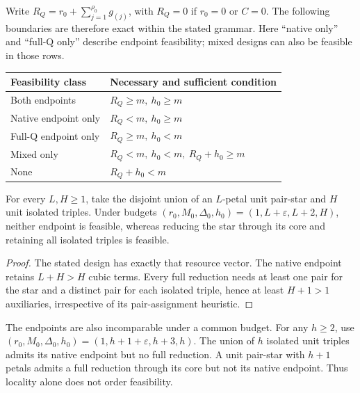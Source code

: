 Write $R_Q=r_0+\sum_{j=1}^{\rho_0}g_{(j)}$, with $R_Q=0$ if $r_0=0$ or
$C=0$. The following boundaries are therefore exact within the stated grammar.
Here ``native only'' and ``full-Q only'' describe endpoint feasibility;
mixed designs can also be feasible in those rows.
\begin{center}
\begin{tabular}{ll}
\toprule
Feasibility class & Necessary and sufficient condition\\
\midrule
Both endpoints & $R_Q\geq m,\ h_0\geq m$\\
Native endpoint only & $R_Q<m,\ h_0\geq m$\\
Full-Q endpoint only & $R_Q\geq m,\ h_0<m$\\
Mixed only & $R_Q<m,\ h_0<m,\ R_Q+h_0\geq m$\\
None & $R_Q+h_0<m$\\
\bottomrule
\end{tabular}
\end{center}

\begin{corollary}
\label{cor:static-star-isolated}
For every $L,H\geq1$, take the disjoint union of an $L$-petal unit pair-star
and $H$ unit isolated triples. Under budgets
$(r_0,M_0,\Delta_0,h_0)=(1,L+\varepsilon,L+2,H)$,
neither endpoint is feasible, whereas reducing the star through its core
and retaining all isolated triples is feasible.
\end{corollary}
\begin{proof}
The stated design has exactly that resource vector. The native endpoint
retains $L+H>H$ cubic terms. Every full reduction needs at least one pair
for the star and a distinct pair for each isolated triple, hence at least
$H+1>1$ auxiliaries, irrespective of its pair-assignment heuristic.
\end{proof}

The endpoints are also incomparable under a common budget. For any
$h\geq2$, use $(r_0,M_0,\Delta_0,h_0)=(1,h+1+\varepsilon,h+3,h)$.
The union of $h$ isolated unit triples admits its native endpoint but no
full reduction. A unit pair-star with $h+1$ petals admits a full reduction
through its core but not its native endpoint. Thus locality alone does not
order feasibility.

